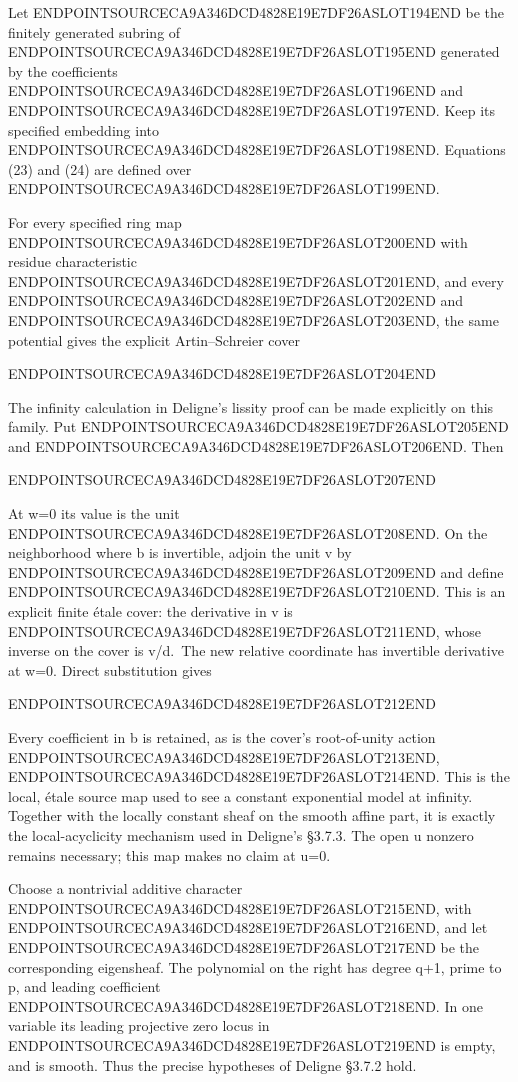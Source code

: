Let ENDPOINTSOURCECA9A346DCD4828E19E7DF26ASLOT194END be the finitely generated subring of ENDPOINTSOURCECA9A346DCD4828E19E7DF26ASLOT195END generated by the coefficients ENDPOINTSOURCECA9A346DCD4828E19E7DF26ASLOT196END and ENDPOINTSOURCECA9A346DCD4828E19E7DF26ASLOT197END. Keep its specified embedding into ENDPOINTSOURCECA9A346DCD4828E19E7DF26ASLOT198END. Equations (23) and (24) are defined over ENDPOINTSOURCECA9A346DCD4828E19E7DF26ASLOT199END.

For every specified ring map ENDPOINTSOURCECA9A346DCD4828E19E7DF26ASLOT200END with residue characteristic ENDPOINTSOURCECA9A346DCD4828E19E7DF26ASLOT201END, and every ENDPOINTSOURCECA9A346DCD4828E19E7DF26ASLOT202END and ENDPOINTSOURCECA9A346DCD4828E19E7DF26ASLOT203END, the same potential gives the explicit Artin--Schreier cover

ENDPOINTSOURCECA9A346DCD4828E19E7DF26ASLOT204END

The infinity calculation in Deligne's lissity proof can be made explicitly on this family. Put ENDPOINTSOURCECA9A346DCD4828E19E7DF26ASLOT205END and ENDPOINTSOURCECA9A346DCD4828E19E7DF26ASLOT206END. Then

ENDPOINTSOURCECA9A346DCD4828E19E7DF26ASLOT207END

At w=0 its value is the unit ENDPOINTSOURCECA9A346DCD4828E19E7DF26ASLOT208END. On the neighborhood where b is invertible, adjoin the unit v by ENDPOINTSOURCECA9A346DCD4828E19E7DF26ASLOT209END and define ENDPOINTSOURCECA9A346DCD4828E19E7DF26ASLOT210END. This is an explicit finite étale cover: the derivative in v is ENDPOINTSOURCECA9A346DCD4828E19E7DF26ASLOT211END, whose inverse on the cover is v/d.~The new relative coordinate has invertible derivative at w=0. Direct substitution gives

ENDPOINTSOURCECA9A346DCD4828E19E7DF26ASLOT212END

Every coefficient in b is retained, as is the cover's root-of-unity action ENDPOINTSOURCECA9A346DCD4828E19E7DF26ASLOT213END, ENDPOINTSOURCECA9A346DCD4828E19E7DF26ASLOT214END. This is the local, étale source map used to see a constant exponential model at infinity. Together with the locally constant sheaf on the smooth affine part, it is exactly the local-acyclicity mechanism used in Deligne's §3.7.3. The open u nonzero remains necessary; this map makes no claim at u=0.

Choose a nontrivial additive character ENDPOINTSOURCECA9A346DCD4828E19E7DF26ASLOT215END, with ENDPOINTSOURCECA9A346DCD4828E19E7DF26ASLOT216END, and let ENDPOINTSOURCECA9A346DCD4828E19E7DF26ASLOT217END be the corresponding eigensheaf. The polynomial on the right has degree q+1, prime to p, and leading coefficient ENDPOINTSOURCECA9A346DCD4828E19E7DF26ASLOT218END. In one variable its leading projective zero locus in ENDPOINTSOURCECA9A346DCD4828E19E7DF26ASLOT219END is empty, and is smooth. Thus the precise hypotheses of Deligne §3.7.2 hold.

